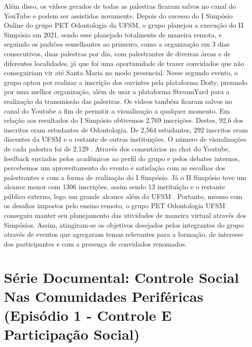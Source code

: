 Além disso, os vídeos gerados de todas as palestras ficaram salvos no canal do YouTube e
podem ser assistidos novamente. Depois do sucesso do I Simpósio Online do grupo PET
Odontologia da UFSM, o grupo planejou a execução do II Simpósio em 2021, sendo esse
planejado totalmente de maneira remota, e seguindo os padrões semelhantes ao primeiro, como a
organização em 3 dias consecutivos, duas palestras por dia, com palestrantes de diversas áreas e
de diferentes localidades, já que foi uma oportunidade de trazer convidados que não
conseguiriam vir até Santa Maria no modo presencial. Nesse segundo evento, o grupo optou por
realizar a inscrição dos ouvintes pela plataforma Doity, prezando por uma melhor organização,
além de usar a plataforma StreamYard para a realização da transmissão das palestras. Os vídeos
também ficaram salvos no canal do Youtube a fim de permitir a visualização a qualquer
momento. Em relação aos resultados do I Simpósio obtivemos 2,769 inscrições. Destes, 92,6%
dos inscritos eram estudantes de Odontologia. De 2,564 estudantes, 292 inscritos eram discentes
da UFSM e o restante de outras instituições. O número de visualizações de cada palestra foi de
2,129 . Através dos comentários no chat do Youtube, feedback enviados pelos acadêmicos ao
perfil do grupo e pelos debates internos, percebemos um aproveitamento do evento e satisfação
com as escolhas dos palestrantes e com a forma de realização do I Simpósio. Já o II Simpósio
teve um alcance menor com 1306 inscrições, assim sendo 13%
instituição e o restante público externo, logo um grande alcance além da UFSM . Portanto,
mesmo com os desafios impostos pelo ensino remoto, o grupo PET Odontologia UFSM
conseguiu manter seu planejamento das atividades de maneira virtual através dos Simpósios.
Assim, atingiram-se os objetivos desejados pelos integrantes do grupo através de eventos que
agregaram temas relevantes para a formação, de interesse dos participantes e com a presença de
convidados renomados.




\section*{Série Documental: Controle Social Nas Comunidades Periféricas  (Episódio 1 - Controle E Participação Social)}


